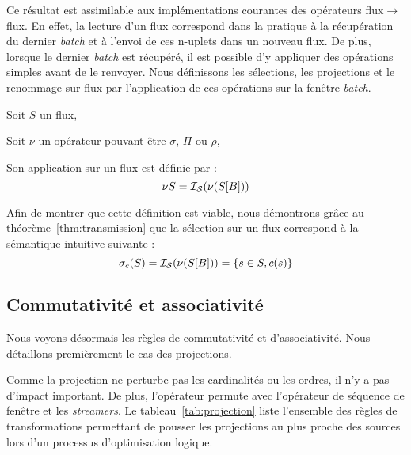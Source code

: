 Ce résultat est assimilable aux implémentations courantes des opérateurs flux$\to$flux. En effet, la lecture d'un flux correspond dans la pratique à la récupération du dernier \textit{batch} et à l'envoi de ces n-uplets dans un nouveau flux. De plus, lorsque le dernier \textit{batch} est récupéré, il est possible d'y appliquer des opérations simples avant de le renvoyer. Nous définissons les sélections, les projections et le renommage sur flux par l'application de ces opérations sur la fenêtre \textit{batch}.

\begin{coro}\label{cor:defunary}
    Soit $S$ un flux,

    Soit $\nu$ un opérateur pouvant être $\sigma$, $\Pi$ ou $\rho$,

    Son application sur un flux est définie par :
$$\nu S = \mathcal{I_S}(\nu(S[B]))$$
\end{coro}

Afin de montrer que cette définition est viable, nous démontrons grâce au théorème~\ref{thm:transmission} que la sélection sur un flux correspond à la sémantique intuitive suivante : $$\sigma_c(S) = \mathcal{I_S}(\nu(S[B])) = \{s\in S, c(s)\}$$

\subsection{Commutativité et associativité}
Nous voyons désormais les règles de commutativité et d'associativité. Nous détaillons premièrement le cas des projections.

Comme la projection ne perturbe pas les cardinalités ou les ordres, il n'y a pas d'impact important. De plus, l'opérateur permute avec l'opérateur de séquence de fenêtre et les \textit{streamers}. Le tableau~\ref{tab:projection} liste l'ensemble des règles de transformations permettant de pousser les projections au plus proche des sources lors d'un processus d'optimisation logique.


